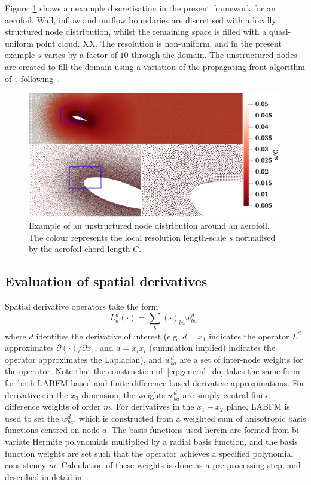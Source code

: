 \documentclass[notitlepage]{revtex4-1}
\begin{document}
Figure~\ref{fig:disc1} shows an example discretisation in the present framework for an aerofoil. Wall, inflow and outflow boundaries are discretised with a locally structured node distribution, whilst the remaining space is filled with a quasi-uniform point cloud. XX. The resolution is non-uniform, and in the present example $s$ varies by a factor of $10$ through the domain. The unstructured nodes are created to fill the domain using a variation of the propagating front algorithm of~\cite{fornberg_2015a}, following~\cite{king_2022}.

\begin{figure}
\includegraphics[width=0.99\textwidth]{./aerofoil_dist.png}
\caption{Example of an unstructured node distribution around an aerofoil. The colour represents the local resolution length-scale $s$ normalised by the aerofoil chord length $C$.\label{fig:disc1}}
\end{figure}


\subsection{Evaluation of spatial derivatives}

Spatial derivative operators take the form
\begin{equation}L^{d}_{a}\left(\cdot\right)=\displaystyle\sum_{b}\left(\cdot\right)_{ba}w^{d}_{ba},\label{eq:general_do}\end{equation}
where $d$ identifies the derivative of interest (e.g. $d=x_{1}$ indicates the operator $L^{d}$ approximates $\partial\left(\cdot\right)/\partial{x}_{1}$, and $d=x_{i}x_{i}$ (summation implied) indicates the operator approximates the Laplacian), and $w^{d}_{ba}$ are a set of inter-node weights for the operator. Note that the construction of~\eqref{eq:general_do} takes the same form for both LABFM-based and finite difference-based derivative approximations. For derivatives in the $x_{3}$ dimension, the weights $w^{d}_{ba}$ are simply central finite difference weights of order $m$. For derivatives in the $x_{1}-x_{2}$ plane, LABFM is used to set the $w^{d}_{ba}$, which is constructed from a weighted sum of anisotropic basis functions centred on node $a$. The basis functions used herein are formed from bi-variate Hermite polynomials multiplied by a radial basis function, and the basis function weights are set such that the operator achieves a specified polynomial consistency $m$. Calculation of these weights is done as a pre-processing step, and described in detail in~\cite{king_2022}. 
\end{document}
